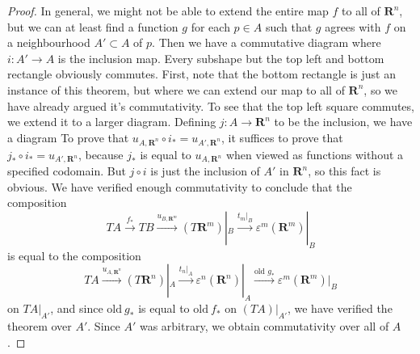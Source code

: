 \begin{proof}
    In general, we might not be able to extend the entire map $f$ to all of $\mathbf{R}^n$, but we can at least find a function $g$ for each $p \in A$ such that $g$ agrees with $f$ on a neighbourhood $A' \subset A$ of $p$. Then we have a commutative diagram
    where $i: A' \to A$ is the inclusion map. Every subshape but the top left and bottom rectangle obviously commutes. First, note that the bottom rectangle is just an instance of this theorem, but where we can extend our map to all of $\mathbf{R}^n$, so we have already argued it's commutativity. To see that the top left square commutes, we extend it to a larger diagram. Defining $j: A \to \mathbf{R}^n$ to be the inclusion, we have a diagram
    To prove that $u_{A,\mathbf{R}^n} \circ i_* = u_{A',\mathbf{R}^n}$, it suffices to prove that $j_* \circ i_* = u_{A', \mathbf{R}^n}$, because $j_*$ is equal to $u_{A,\mathbf{R}^n}$ when viewed as functions without a specified codomain. But $j \circ i$ is just the inclusion of $A'$ in $\mathbf{R}^n$, so this fact is obvious. We have verified enough commutativity to conclude that the composition
    \[ TA \xrightarrow{f_*} TB \xrightarrow{u_{B,\mathbf{R}^m}} (T\mathbf{R}^m)|_B \xrightarrow{t_m|_B} \varepsilon^m(\mathbf{R}^m)|_B \]
    is equal to the composition
    \[ TA \xrightarrow{u_{A,\mathbf{R}^n}} (T\mathbf{R}^n)|_A \xrightarrow{t_n|_A} \varepsilon^n(\mathbf{R}^n)|_A \xrightarrow{\text{old\ $g_*$}} \varepsilon^m(\mathbf{R}^m)|_B \]
    on $TA|_{A'}$, and since $\text{old}\ g_*$ is equal to $\text{old}\ f_*$ on $(TA)|_{A'}$, we have verified the theorem over $A'$. Since $A'$ was arbitrary, we obtain commutativity over all of $A$.
\end{proof}

